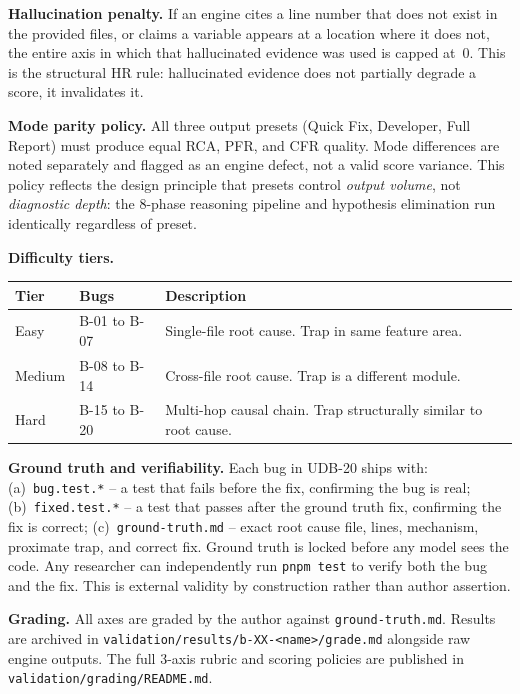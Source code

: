 \documentclass[12pt,a4paper]{article}
\newcommand{\code}[1]{\texttt{\small #1}}
\begin{document}
\textbf{Hallucination penalty.} If an engine cites a line number that does not exist in
the provided files, or claims a variable appears at a location where it does not, the
entire axis in which that hallucinated evidence was used is capped at~0. This is the
structural HR rule: hallucinated evidence does not partially degrade a score, it
invalidates it.

\textbf{Mode parity policy.} All three output presets (Quick Fix, Developer, Full Report)
must produce equal RCA, PFR, and CFR quality. Mode differences are noted separately and
flagged as an engine defect, not a valid score variance. This policy reflects the design
principle that presets control \textit{output volume}, not \textit{diagnostic depth}: the
8-phase reasoning pipeline and hypothesis elimination run identically regardless of preset.

\textbf{Difficulty tiers.}

\begin{center}
\begin{tabular}{@{}lll@{}}
\toprule
\textbf{Tier} & \textbf{Bugs} & \textbf{Description} \\
\midrule
Easy   & B-01 to B-07 & Single-file root cause. Trap in same feature area. \\
Medium & B-08 to B-14 & Cross-file root cause. Trap is a different module. \\
Hard   & B-15 to B-20 & Multi-hop causal chain. Trap structurally similar to root cause. \\
\bottomrule
\end{tabular}
\end{center}

\textbf{Ground truth and verifiability.} Each bug in UDB-20 ships with:
(a)~\code{bug.test.*} -- a test that fails before the fix, confirming the bug is real;
(b)~\code{fixed.test.*} -- a test that passes after the ground truth fix, confirming the
fix is correct; (c)~\code{ground-truth.md} -- exact root cause file, lines, mechanism,
proximate trap, and correct fix. Ground truth is locked before any model sees the code.
Any researcher can independently run \code{pnpm test} to verify both the bug and the fix.
This is external validity by construction rather than author assertion.

\textbf{Grading.} All axes are graded by the author against \code{ground-truth.md}.
Results are archived in \code{validation/results/b-XX-<name>/grade.md} alongside raw
engine outputs. The full 3-axis rubric and scoring policies are published in
\code{validation/grading/README.md}.
\end{document}
